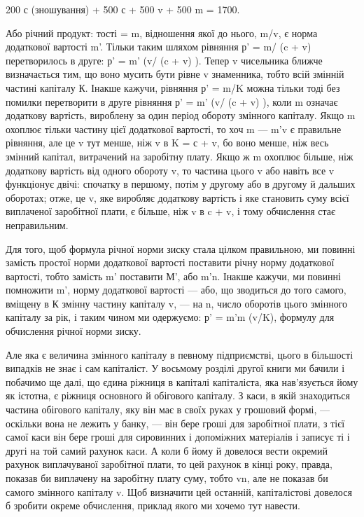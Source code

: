 200 с (зношування) + 500 с + 500 v + 500 m = 1700.

Або річний продукт:
тості = m, відношення якої до нього, m/v, є норма додаткової
вартості m'. Тільки таким шляхом рівняння р' = m/ (c + v) перетворилось
в друге: р' = m' (v/ (c + v) ). Тепер v чисельника ближче визначається
тим, що воно мусить бути рівне v знаменника, тобто
всій змінній частині капіталу К. Інакше кажучи, рівняння
р' = m/K можна тільки тоді без помилки перетворити в друге рівняння
р' = m' (v/ (c + v) ), коли m означає додаткову вартість, вироблену
за один період обороту змінного капіталу. Якщо m охоплює
тільки частину цієї додаткової вартості, то хоч m — m'v є
правильне рівняння, але це v тут менше, ніж v в K = с + v, бо
воно менше, ніж весь змінний капітал, витрачений на заробітну
плату. Якщо ж m охоплює більше, ніж додаткову вартість від
одного обороту v, то частина цього v або навіть все v функціонує
двічі: спочатку в першому, потім у другому або в другому
й дальших оборотах; отже, це v, яке виробляє додаткову
вартість і яке становить суму всієї виплаченої заробітної плати,
є більше, ніж v в c + v, і тому обчислення стає неправильним.

Для того, щоб формула річної норми зиску стала цілком
правильною, ми повинні замість простої норми додаткової вартості
поставити річну норму додаткової вартості, тобто замість
m' поставити М', або m'n. Інакше кажучи, ми повинні помножити
m', норму додаткової вартості — або, що зводиться до
того самого, вміщену в К змінну частину капіталу v, — на n,
число оборотів цього змінного капіталу за рік, і таким чином
ми одержуємо: р' = m'm (v/K), формулу для обчислення річної
норми зиску.

Але яка є величина змінного капіталу в певному підприємстві,
цього в більшості випадків не знає і сам капіталіст.
У восьмому розділі другої книги ми бачили і побачимо ще
далі, що єдина ріжниця в капіталі капіталіста, яка нав’язується
йому як істотна, є ріжниця основного й обігового капіталу.
З каси, в якій знаходиться частина обігового капіталу, яку він
має в своїх руках у грошовий формі, — оскільки вона не лежить
у банку, — він бере гроші для заробітної плати, з тієї самої
каси він бере гроші для сировинних і допоміжних матеріалів
і записує ті і другі на той самий рахунок каси. А коли б йому
й довелося вести окремий рахунок виплачуваної заробітної
плати, то цей рахунок в кінці року, правда, показав би виплачену
на заробітну плату суму, тобто vn, але не показав би
самого змінного капіталу v. Щоб визначити цей останній, капіталістові
довелося б зробити окреме обчислення, приклад якого
ми хочемо тут навести.

